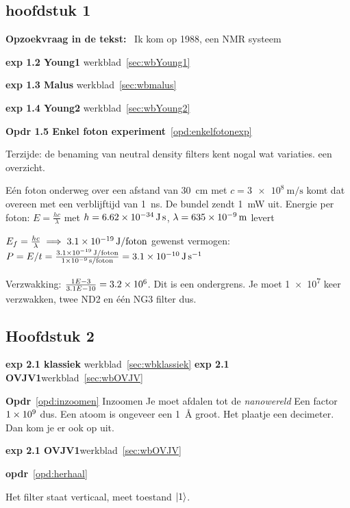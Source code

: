 \documentclass[../../main.tex]{subfiles}
\begin{document}
\subsection*{hoofdstuk 1}

\textbf{Opzoekvraag in de tekst:}~\cite{timeline2021}
Ik kom op 1988, een NMR systeem

\textbf{exp 1.2 Young1} werkblad~\ref{sec:wbYoung1}

\textbf{exp 1.3 Malus} werkblad~\ref{sec:wbmalus}

\textbf{exp 1.4 Young2} werkblad~\ref{sec:wbYoung2}

\textbf{Opdr 1.5 Enkel foton experiment}~\ref{opd:enkelfotonexp}

Terzijde: de benaming van neutral density filters kent nogal wat variaties.  een overzicht.

E\'en foton onderweg over een afstand van \SI{30}{\centi\meter} met $c=\SI{3e8}{\meter\per\second}$ komt dat overeen met een verblijftijd  van \SI{1}{\nano\second}.
De bundel zendt \SI{1}{\milli\watt} uit. Energie per foton: $E=\tfrac{hc}{\lambda}$
met $h=\SI{6.62E-34}{\joule\second}$, $\lambda=\SI{635E-9}{\meter}$
levert

$E_f=\tfrac{hc}{\lambda} \implies \SI{3.1E-19}{\joule\per foton}$
gewenst vermogen: $P=E/t=\tfrac{\SI{3.1E-19}{\joule\per foton}}{\SI{1E-9}{\second\per foton}}=\SI{3.1E-10}{\joule\per\second}$

Verzwakking: $\tfrac{1E-3}{3.1E-10}=\num{3.2E6}$. Dit is een ondergrens. Je moet \num{1e7} keer verzwakken, twee ND2 en \'e\'en NG3 filter dus.

\subsection*{Hoofdstuk 2}

\textbf{exp 2.1 klassiek} werkblad~\ref{sec:wbklassiek}
\textbf{exp 2.1 OVJV1}werkblad~\ref{sec:wbOVJV}


\textbf{Opdr}~\ref{opd:inzoomen} Inzoomen
Je moet afdalen tot de \textit{nanowereld} Een factor $\num{1E9}$ dus.
Een atoom is ongeveer een \SI{1}{\angstrom} groot. Het plaatje een decimeter. Dan kom je er ook op uit. 

\textbf{exp 2.1 OVJV1}werkblad~\ref{sec:wbOVJV}

\textbf{opdr}~\ref{opd:herhaal}

Het filter staat verticaal, meet toestand $\ket{1}$.
\end{document}
